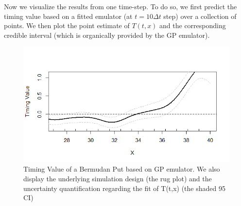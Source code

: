 \documentclass[]{article}
\newenvironment{Shaded}{\begin{snugshade}}{\end{snugshade}}
\newcommand{\KeywordTok}[1]{\textcolor[rgb]{0.13,0.29,0.53}{\textbf{#1}}}
\newcommand{\DataTypeTok}[1]{\textcolor[rgb]{0.13,0.29,0.53}{#1}}
\newcommand{\DecValTok}[1]{\textcolor[rgb]{0.00,0.00,0.81}{#1}}
\newcommand{\FloatTok}[1]{\textcolor[rgb]{0.00,0.00,0.81}{#1}}
\newcommand{\StringTok}[1]{\textcolor[rgb]{0.31,0.60,0.02}{#1}}
\newcommand{\CommentTok}[1]{\textcolor[rgb]{0.56,0.35,0.01}{\textit{#1}}}
\newcommand{\OtherTok}[1]{\textcolor[rgb]{0.56,0.35,0.01}{#1}}
\newcommand{\OperatorTok}[1]{\textcolor[rgb]{0.81,0.36,0.00}{\textbf{#1}}}
\newcommand{\NormalTok}[1]{#1}
\begin{document}
Now we visualize the results from one time-step. To do so, we first
predict the timing value based on a fitted emulator (at \(t=10\Delta t\)
step) over a collection of points. We then plot the point estimate of
\(T(t,x)\) and the corresponding credible interval (which is organically
provided by the GP emulator).

\begin{Shaded}
\end{Shaded}

\begin{figure}
\centering
\includegraphics{figures/Fitted-GP-1.png}
\caption{Timing Value of a Bermudan Put based on GP emulator. We also
display the underlying simulation design (the rug plot) and the
uncertainty quantification regarding the fit of T(t,x) (the shaded 95
CI)}
\end{figure}
\end{document}
